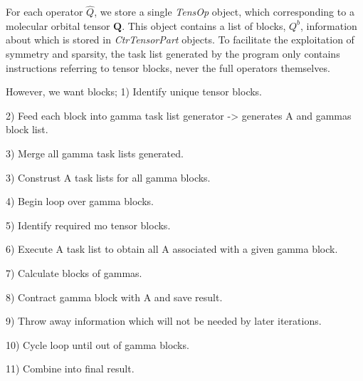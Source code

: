 \noindent For each operator $\hat{Q}$, we store a single \emph{TensOp} object, which corresponding to
a molecular orbital tensor $\mathbf{Q}$. This object contains a list of blocks, $Q^{b}$, information about which is stored
in  \emph{CtrTensorPart} objects. To facilitate the exploitation of symmetry and sparsity, the task list generated by the program 
only contains instructions referring to tensor blocks, never the full operators themselves.



However, we want blocks; 
1) Identify unique tensor blocks.

2) Feed each block into gamma task list generator -> generates A and gammas block list.

3) Merge all gamma task lists generated.

3) Construst A task lists for all gamma blocks.

4) Begin loop over gamma blocks. 

5) Identify required mo tensor blocks. 

6) Execute A task list to obtain all A associated with a given gamma block.

7) Calculate blocks of gammas. 

8) Contract gamma block  with A and save result.

9) Throw away information which will not be needed by later iterations. 

10) Cycle loop until out of gamma blocks.

11) Combine into final result.



